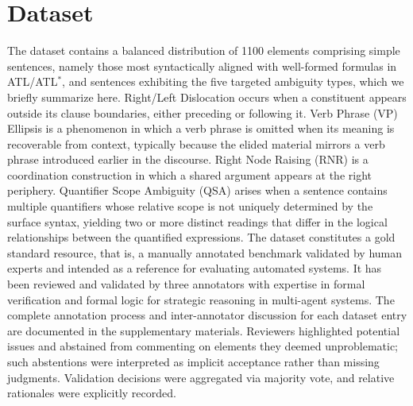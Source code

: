 \section{Dataset}
\label{sec:dataset}
The dataset contains a balanced distribution of 1100 elements comprising simple sentences, namely those most syntactically aligned with well-formed formulas in ATL/ATL$^\ast$, and sentences exhibiting the five targeted ambiguity types, which we briefly summarize here. Right/Left Dislocation occurs when a constituent appears outside its clause boundaries, either preceding or following it. Verb Phrase (VP) Ellipsis is a phenomenon in which a verb phrase is omitted when its meaning is recoverable from context, typically because the elided material mirrors a verb phrase introduced earlier in the discourse. Right Node Raising (RNR) is a coordination construction in which a shared argument appears at the right periphery. Quantifier Scope Ambiguity (QSA) arises when a sentence contains multiple quantifiers whose relative scope is not uniquely determined by the surface syntax, yielding two or more distinct readings that differ in the logical relationships between the quantified expressions. The dataset constitutes a gold standard resource, that is, a manually annotated benchmark validated by human experts and intended as a reference for evaluating automated systems. It has been reviewed and validated by three annotators with expertise in formal verification and formal logic for strategic reasoning in multi-agent systems. The complete annotation process and inter-annotator discussion for each dataset entry are documented in the supplementary materials. Reviewers highlighted potential issues and abstained from commenting on elements they deemed unproblematic; such abstentions were interpreted as implicit acceptance rather than missing judgments. Validation decisions were aggregated via majority vote, and relative rationales were explicitly recorded. 

